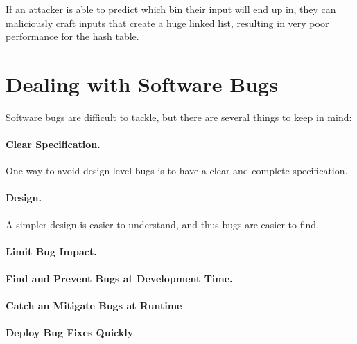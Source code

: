 If an attacker is able to predict which bin their input will end up in, they can maliciously craft inputs that create a huge linked list, resulting in very poor performance for the hash table.

\section{Dealing with Software Bugs}
Software bugs are difficult to tackle, but there are several things to keep in mind:

\paragraph{Clear Specification.} One way to avoid design-level bugs is to have a clear and complete specification.

\paragraph{Design.} A simpler design is easier to understand, and thus bugs are easier to find.

\paragraph{Limit Bug Impact.} 

\paragraph{Find and Prevent Bugs at Development Time.}

\paragraph{Catch an Mitigate Bugs at Runtime}

\paragraph{Deploy Bug Fixes Quickly}
